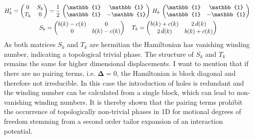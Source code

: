 \begin{gather*}
    H_k' = \begin{pmatrix}
        0 & S_k\\
        T_k & 0
    \end{pmatrix}= \half\,\begin{pmatrix}
        \mathbb{1} & \mathbb{1}\\
        \mathbb{1} & -\mathbb{1}
    \end{pmatrix}\,H_k\,\begin{pmatrix}
        \mathbb{1} & \mathbb{1}\\
        \mathbb{1} & -\mathbb{1}
    \end{pmatrix}\\\
    S_k = \begin{pmatrix}
        b(k)-c(k) & 0\\
        0 & b(k)-c(k)
    \end{pmatrix}\quad T_k = \begin{pmatrix}
        b(k)+c(k) & 2\,d(k)\\
        2\,\bar{d}(k) & b(k) + c(k)
    \end{pmatrix}
\end{gather*}%
As both matrices $S_k$ and $T_k$ are hermitian the Hamiltonian has vanishing winding number, indicating a topological trivial phase. The structure of $S_k$ and $T_k$ remains the same for higher dimensional displacements. I want to mention that if there are no pairing terms, i.e. $\mathbf{\Delta}=0$, the Hamiltonian is block diagonal and therefore not irreducible. In this case the introduction of holes is redundant and the winding number can be calculated from a single block, which can lead to non-vanishing winding numbers. It is thereby shown that the pairing terms prohibit the occurrence of topologically non-trivial phases in 1D for motional degrees of freedom stemming from a second order tailor expansion of an interaction potential.\hfill\newpage


